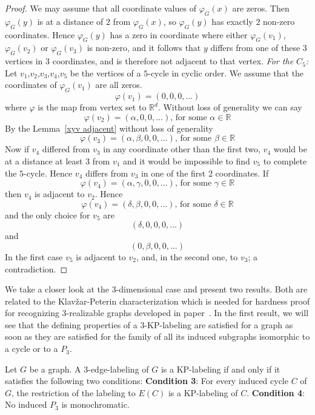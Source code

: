 \documentclass[12pt,a4paper,titlepage,openany]{report}
\begin{document}
\begin{proof}
We may assume that all coordinate values of $\varphi_G(x)$ are zeros. Then $\varphi_G(y)$ is at a distance of $2$ from $\varphi_G(x)$, so $\varphi_G(y)$ has exactly $2$ non-zero coordinates. Hence $\varphi_G(y)$ has a zero in coordinate where either $\varphi_G(v_1)$, $\varphi_G(v_2)$ or $\varphi_G(v_3)$ is non-zero, and it follows that $y$ differs from one of these $3$ vertices in $3$ coordinates, and is therefore not adjacent to that vertex.\newline
\textit{For the $C_5$:} Let $v_1$,$v_2$,$v_3$,$v_4$,$v_5$ be the vertices of a $5$-cycle in cyclic order. We assume that the coordinates of $\varphi_G(v_1)$ are all zeros.
$$\varphi (v_1)=(0,0,0,\ldots)$$ where $\varphi$ is the map from vertex set to $\mathbb{R}^d$.\newline
Without loss of generality we can say
$$\varphi (v_2)=(\alpha,0,0,\ldots) \text{, for some } \alpha \in \mathbb{R} $$
By the Lemma~\ref{xyv adjacent} without loss of generality
$$\varphi (v_3)=(\alpha,\beta,0,0,\ldots) \text{, for some } \beta \in \mathbb{R}$$
Now if $v_4$ differed from $v_3$ in any coordinate other than the first two, $v_4$ would be at a distance at least $3$ from $v_1$ and it would be impossible to find $v_5$ to complete the $5$-cycle. Hence $v_4$ differs from $v_3$ in one of the first 2 coordinates. If 
$$\varphi (v_4)=(\alpha,\gamma,0,0,\ldots) \text{, for some } \gamma \in \mathbb{R}$$
then $v_4$ is adjacent to $v_2$. Hence
$$\varphi (v_4)=(\delta,\beta,0,0,\ldots) \text{, for some } \delta \in \mathbb{R}$$
and the only choice for $v_5$ are
$$(\delta,0,0,0,\ldots)$$
and 
$$(0,\beta,0,0,\ldots)$$
In the first case $v_5$ is adjacent to $v_2$, and, in the  second one, to $v_3$; a contradiction.
 
\end{proof}
\medskip
We take a closer look at the 3-dimensional case and present two results. Both are related to the Klav\v zar-Peterin characterization which is needed for hardness proof for recognizing 3-realizable graphs developed in paper~\cite{Milanic}.\newline
In the first result, we will see that the defining properties of a 3-KP-labeling are satisfied for a graph as soon as they are satisfied for the family of all its induced subgraphs isomorphic to a cycle or to a $P_3$.

\begin{theorem}\label{3-edge-label}
Let $G$ be a graph. A 3-edge-labeling of $G$ is a KP-labeling if and only if it satisfies the following two conditions:\newline
\textbf{Condition 3}: For every induced cycle $C$ of $G$, the restriction of the labeling to $E(C)$ is
a KP-labeling of $C$.\newline
\textbf{Condition 4}: No induced $P_3$ is monochromatic.
\end{theorem}
\end{document}
